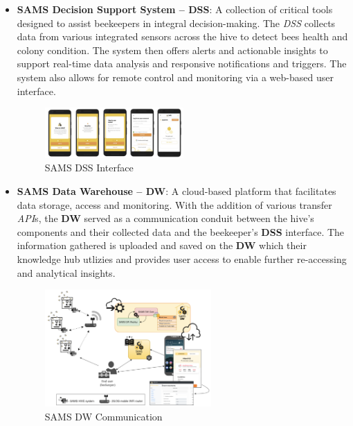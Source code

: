 \documentclass[12pt]{article}
\begin{document}
\begin{itemize}
		\item \textbf{SAMS Decision Support System – DSS}:
		A collection of critical tools designed to assist beekeepers in integral decision-making. The \textit{DSS} collects data from various integrated sensors across the hive to detect bees health and colony condition. The system then offers alerts and actionable insights to support real-time data analysis and responsive notifications and triggers. The system also allows for remote control and monitoring via a web-based user interface.
		\begin{figure}[H]
			\centering
			\includegraphics[width=0.5\textwidth]{Images/Simillar/Interface_DSS_old.png}
			\caption{SAMS DSS Interface \cite{sams_figma_design}}
			\label{fig:SAMS_DSS}
			\vspace{0.5 cm}
		\end{figure}
		\item \textbf{SAMS Data Warehouse – DW}: A cloud-based platform that facilitates data storage, access and monitoring. With the addition of various transfer \textit{API}s, the \textbf{DW} served as a communication conduit between the hive's components and their collected data and the beekeeper's \textbf{DSS} interface. The information gathered is uploaded and saved on the \textbf{DW} which their knowledge hub utlizies and provides user access to enable further re-accessing and analytical insights.
		\begin{figure}[H]
			\centering
			\includegraphics[width=0.6\textwidth]{Images/Simillar/interface_comm.png}
			\caption{SAMS DW Communication \cite{sams_project_results}}
			\label{fig:SAMS_DW}
		\end{figure}
	\end{itemize}
	
\end{document}
